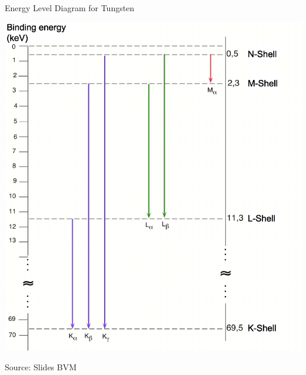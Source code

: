 \begin{frame}{Energy Level Diagram for Tungsten}
    \begin{center}\includegraphics[height=0.8\textheight ]{images/tungsten_energylevel}\end{center}
    \begin{flushright}
        \scriptsize Source: Slides BVM
    \end{flushright}
\end{frame}


